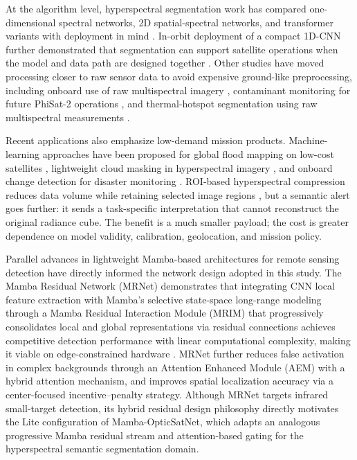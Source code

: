 \documentclass[a4paper,fleqn]{cas-dc}
\begin{document}
At the algorithm level, hyperspectral segmentation work has compared one-dimensional spectral networks, 2D spatial-spectral networks, and transformer variants with deployment in mind \cite{justo2025hyperspectral}. In-orbit deployment of a compact 1D-CNN further demonstrated that segmentation can support satellite operations when the model and data path are designed together \cite{justo2024semantic}. Other studies have moved processing closer to raw sensor data to avoid expensive ground-like preprocessing, including onboard use of raw multispectral imagery \cite{meoni2024unlocking}, contaminant monitoring for future PhiSat-2 operations \cite{razzano2024ai, giordano2017roi}, and thermal-hotspot segmentation using raw multispectral measurements \cite{traba2026thermal}.

Recent applications also emphasize low-demand mission products. Machine-learning approaches have been proposed for global flood mapping on low-cost satellites \cite{mateo2021towards}, lightweight cloud masking in hyperspectral imagery \cite{ali2026lightweight}, and onboard change detection for disaster monitoring \cite{herec2026sttorm}. ROI-based hyperspectral compression reduces data volume while retaining selected image regions \cite{giordano2017roi}, but a semantic alert goes further: it sends a task-specific interpretation that cannot reconstruct the original radiance cube. The benefit is a much smaller payload; the cost is greater dependence on model validity, calibration, geolocation, and mission policy.

Parallel advances in lightweight Mamba-based architectures for remote sensing detection have directly informed the network design adopted in this study. The Mamba Residual Network (MRNet) demonstrates that integrating CNN local feature extraction with Mamba’s selective state-space long-range modeling through a Mamba Residual Interaction Module (MRIM) that progressively consolidates local and global representations via residual connections achieves competitive detection performance with linear computational complexity, making it viable on edge-constrained hardware \cite{ye2025lightweight}. MRNet further reduces false activation in complex backgrounds through an Attention Enhanced Module (AEM) with a hybrid attention mechanism, and improves spatial localization accuracy via a center-focused incentive–penalty strategy. Although MRNet targets infrared small-target detection, its hybrid residual design philosophy directly motivates the Lite configuration of Mamba-OpticSatNet, which adapts an analogous progressive Mamba residual stream and attention-based gating for the hyperspectral semantic segmentation domain.
\end{document}
